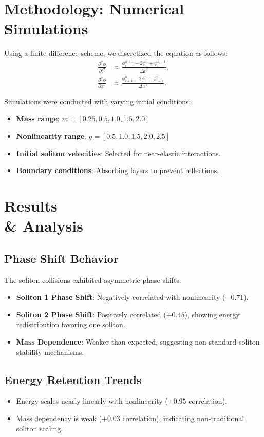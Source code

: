 \documentclass{article}
\begin{document}
\section{Methodology: Numerical Simulations}
Using a finite-difference scheme, we discretized the equation as follows:
\begin{align}
\frac{\partial^2 \phi}{\partial t^2} &\approx \frac{\phi_i^{n+1} - 2 \phi_i^n + \phi_i^{n-1}}{\Delta t^2}, \\
\frac{\partial^2 \phi}{\partial x^2} &\approx \frac{\phi_{i+1}^n - 2 \phi_i^n + \phi_{i-1}^n}{\Delta x^2}.
\end{align}

Simulations were conducted with varying initial conditions:
\begin{itemize}
    \item \textbf{Mass range}: $m = [0.25, 0.5, 1.0, 1.5, 2.0]$
    \item \textbf{Nonlinearity range}: $g = [0.5, 1.0, 1.5, 2.0, 2.5]$
    \item \textbf{Initial soliton velocities}: Selected for near-elastic interactions.
    \item \textbf{Boundary conditions}: Absorbing layers to prevent reflections.
\end{itemize}

\section{Results \\& Analysis}
\subsection{Phase Shift Behavior}
The soliton collisions exhibited asymmetric phase shifts:
\begin{itemize}
    \item \textbf{Soliton 1 Phase Shift}: Negatively correlated with nonlinearity ($-0.71$).
    \item \textbf{Soliton 2 Phase Shift}: Positively correlated ($+0.45$), showing energy redistribution favoring one soliton.
    \item \textbf{Mass Dependence}: Weaker than expected, suggesting non-standard soliton stability mechanisms.
\end{itemize}

\subsection{Energy Retention Trends}
\begin{itemize}
    \item Energy scales nearly linearly with nonlinearity ($+0.95$ correlation).
    \item Mass dependency is weak ($+0.03$ correlation), indicating non-traditional soliton scaling.
\end{itemize}
\end{document}
